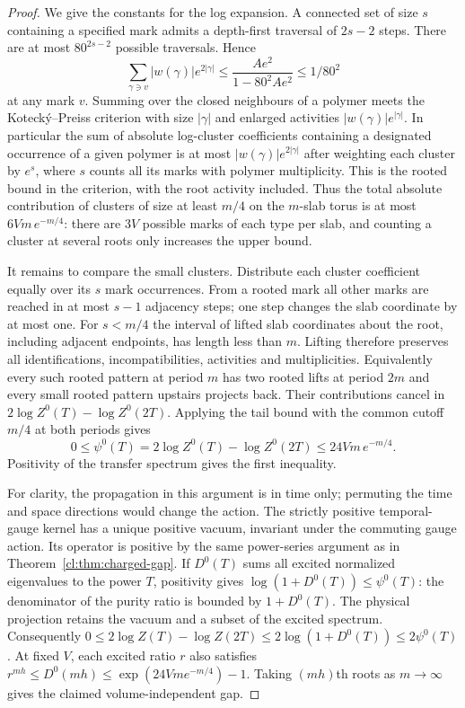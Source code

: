 \begin{proof}
We give the constants for the log expansion. A connected set of size
$s$ containing a specified mark admits a depth-first traversal of
$2s-2$ steps. There are at most $80^{2s-2}$ possible traversals. Hence
\[
 \sum_{\gamma\ni v}|w(\gamma)|e^{2|\gamma|}
 \le \frac{Ae^2}{1-80^2Ae^2}\le 1/80^2
\]
at any mark $v$. Summing over the closed neighbours of a polymer meets
the Koteck\'y--Preiss criterion \cite{KP86} with size $|\gamma|$
and enlarged activities $|w(\gamma)|e^{|\gamma|}$. In particular the
sum of absolute log-cluster coefficients containing a designated
occurrence of a given polymer is at most
$|w(\gamma)|e^{2|\gamma|}$ after weighting each cluster by $e^s$,
where $s$ counts all its marks with polymer multiplicity. This is the
rooted bound in the criterion, with the root activity included.
Thus the total absolute contribution of clusters of size at least
$m/4$ on the $m$-slab torus is at most $6Vm\,e^{-m/4}$: there are
$3V$ possible marks of each type per slab, and counting a cluster
at several roots only increases the upper bound.

It remains to compare the small clusters. Distribute each cluster
coefficient equally over its $s$ mark occurrences. From a rooted mark
all other marks are reached in at most $s-1$ adjacency steps; one
step changes the slab coordinate by at most one. For $s<m/4$ the
interval of lifted slab coordinates about the root, including adjacent
endpoints, has length less than $m$. Lifting therefore preserves all
identifications, incompatibilities, activities and multiplicities.
Equivalently every such rooted pattern at period $m$ has two rooted
lifts at period $2m$ and every small rooted pattern upstairs projects
back. Their contributions cancel in $2\log Z^0(T)-\log Z^0(2T)$.
Applying the tail bound with the common cutoff $m/4$ at both periods
gives
\[
 0\le \psi^0(T)=2\log Z^0(T)-\log Z^0(2T)
 \le 24Vm\,e^{-m/4}.
\]
Positivity of the transfer spectrum gives the first inequality.

For clarity, the propagation in this argument is in time only;
permuting the time and space directions would change the action.
The strictly positive temporal-gauge kernel has a unique positive
vacuum, invariant under the commuting gauge action. Its operator is
positive by the same power-series argument as in
Theorem~\ref{cl:thm:charged-gap}. If $D^0(T)$ sums all excited normalized
eigenvalues to the power $T$, positivity gives
$\log(1+D^0(T))\le\psi^0(T)$: the denominator of the purity ratio
is bounded by $1+D^0(T)$. The physical projection retains the vacuum
and a subset of the excited spectrum. Consequently
$0\le2\log Z(T)-\log Z(2T)\le2\log(1+D^0(T))\le2\psi^0(T)$.
At fixed $V$, each excited ratio $r$ also satisfies
$r^{mh}\le D^0(mh)\le\exp(24Vm e^{-m/4})-1$. Taking $(mh)$th
roots as $m\to\infty$ gives the claimed volume-independent gap.


\end{proof}
